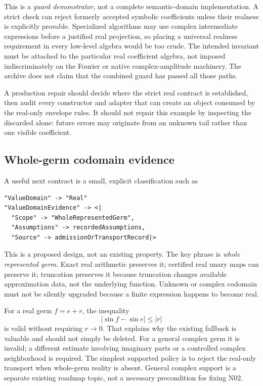 \documentclass[11pt,a4paper]{article}
\newcommand{\code}[1]{\texttt{\detokenize{#1}}}
\begin{document}
This is a \emph{guard demonstrator}, not a complete semantic-domain implementation. A strict check can reject formerly accepted symbolic coefficients unless their realness is explicitly provable. Specialized algorithms may use complex intermediate expressions before a justified real projection, so placing a universal realness requirement in every low-level algebra would be too crude. The intended invariant must be attached to the particular real coefficient algebra, not imposed indiscriminately on the Fourier or native complex-amplitude machinery. The archive does not claim that the combined guard has passed all those paths.

A production repair should decide where the strict real contract is established, then audit every constructor and adapter that can create an object consumed by the real-only envelope rules. It should not repair this example by inspecting the discarded \code{FrontierTerm} alone: future errors may originate from an unknown tail rather than one visible coefficient.

\subsection{Whole-germ codomain evidence}
A useful next contract is a small, explicit classification such as
\begin{lstlisting}
"ValueDomain" -> "Real"
"ValueDomainEvidence" -> <|
  "Scope" -> "WholeRepresentedGerm",
  "Assumptions" -> recordedAssumptions,
  "Source" -> admissionOrTransportRecord|>
\end{lstlisting}
This is a proposed design, not an existing property. The key phrase is \emph{whole represented germ}. Exact real arithmetic preserves it; certified real unary maps can preserve it; truncation preserves it because truncation changes available approximation data, not the underlying function. Unknown or complex codomain must not be silently upgraded because a finite expression happens to become real.

For a real germ \(f=e+r\), the inequality
\[
 |\sin f-\sin e|\le |r|
\]
is valid without requiring \(r\to0\). That explains why the existing fallback is valuable and should not simply be deleted. For a general complex germ it is invalid; a different estimate involving imaginary parts or a controlled complex neighborhood is required. The simplest supported policy is to reject the real-only transport when whole-germ reality is absent. General complex support is a separate existing roadmap topic, not a necessary precondition for fixing N02.
\end{document}
